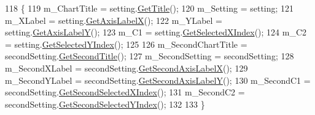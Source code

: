 \begin{DoxyCode}
118                                                                                \{
119              m\_ChartTitle = setting.\hyperlink{class_data_attribute_ade9747a192ba22fe1020e874bff6a48c}{GetTitle}();
120              m\_Setting = setting;
121              m\_XLabel = setting.\hyperlink{class_data_attribute_aecb451704a87d77dd80dbad8a19099d1}{GetAxisLabelX}();
122              m\_YLabel = setting.\hyperlink{class_data_attribute_af5f68794cd0195d42135d5e48120ccc0}{GetAxisLabelY}();
123              m\_C1 = setting.\hyperlink{class_data_attribute_a0f4a54973bc44b0526f78bda945dc81b}{GetSelectedXIndex}();
124              m\_C2 = setting.\hyperlink{class_data_attribute_a82e7519853d9f470ea183dd0c39a03d6}{GetSelectedYIndex}();
125              
126              m\_SecondChartTitle = secondSetting.\hyperlink{class_data_attribute_a4079522c93025fce7569eaed585f4aeb}{GetSecondTitle}();
127              m\_SecondSetting = secondSetting;
128              m\_SecondXLabel = secondSetting.\hyperlink{class_data_attribute_a8ace4cb1fee9e2abeabe3efc9a190c8f}{GetSecondAxisLabelX}();
129              m\_SecondYLabel = secondSetting.\hyperlink{class_data_attribute_a6efb7e067317898feefbbf6bd472b998}{GetSecondAxisLabelY}();
130              m\_SecondC1 = secondSetting.\hyperlink{class_data_attribute_a7f501790eee650ddf9ac17c4f63a3995}{GetSecondSelectedXIndex}();
131              m\_SecondC2 = secondSetting.\hyperlink{class_data_attribute_a6f61ad05915f4aa31ad3dba00596da64}{GetSecondSelectedYIndex}();
132             
133         \}
\end{DoxyCode}



